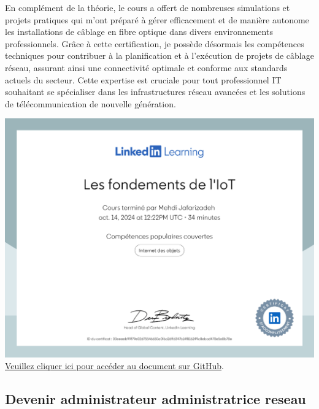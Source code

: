 \documentclass{article}
\begin{document}
    En complément de la théorie, le cours a offert de nombreuses simulations et projets pratiques qui m'ont préparé à gérer efficacement et de manière autonome les installations de câblage en fibre optique dans divers environnements professionnels. Grâce à cette certification, je possède désormais les compétences techniques pour contribuer à la planification et à l'exécution de projets de câblage réseau, assurant ainsi une connectivité optimale et conforme aux standards actuels du secteur. Cette expertise est cruciale pour tout professionnel IT souhaitant se spécialiser dans les infrastructures réseau avancées et les solutions de télécommunication de nouvelle génération.
    \newline
    

        \begin{center}
            \includegraphics[width=\textwidth,height=\textheight,keepaspectratio]{../Document/Certificats de Fin de Cours/Les fondements de lIoT/Les fondements de lIoT.pdf}
            \footnotesize
             \href{https://github.com/jafarizadeh/CV---lettre/tree/00df58c41988ba7488536512caee235bdb5d570d/Document/Certificats%20de%20Fin%20de%20Cours/Les%20fondements%20de%20lIoT}{Veuillez cliquer ici pour accéder au document sur GitHub}.
        \end{center}

    \newpage
    \subsection{Devenir administrateur  administratrice reseau}
\end{document}
